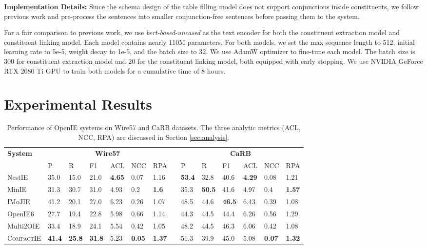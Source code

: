 \documentclass[11pt,a4paper]{article}
\newcommand{\system}{{\textsc{CompactIE}}}
\begin{document}
\noindent
\textbf{{Implementation Details:}} 
{Since the schema design of the table filling model does not support conjunctions inside constituents, we follow previous work \citep{openie6} and pre-process the sentences into smaller conjunction-free sentences before passing them to the system. }

For a fair comparison to previous work, we use {\it bert-based-uncased} \cite{DBLP:journals/corr/abs-1810-04805} as the text encoder for both the constituent extraction model and constituent linking model. Each model contains nearly 110M parameters. {For both models, we set the max sequence length to 512, initial learning rate to 5e-5, weight decay to 1e-5, and the batch size to 32}. We use AdamW optimizer to fine-tune each model. The batch size is 300 for constituent extraction model and 20 for the constituent linking model, both equipped with early stopping.
We use NVIDIA GeForce RTX 2080 Ti GPU to train both models for a cumulative time of 8 hours.

\section{Experimental Results}
\label{experimental_results}

\begin{table*}[t]
\begin{center}
\resizebox{0.9\linewidth}{!} {
\begin{tabular}{llllllllllllll} 
\hline
\textbf{System} & \multicolumn{6}{c}{\textbf{Wire57}} && \multicolumn{6}{c}{\textbf{CaRB}}\\
\cline{2-7} \cline{9-14}
 & P & R & F1 & ACL & NCC & RPA & & P & R & F1 & ACL & NCC & RPA\\
\hline
NestIE & 35.0 & 15.0 & 21.0 & {\bf 4.65} & 0.07 & 1.16 & & {\bf 53.4} & 32.8 & 40.6 & \textbf{4.29} & 0.08 & 1.21\\ 
MinIE & 31.3 & 30.7 & 31.0 & 4.93 & 0.2 & \textbf{1.6} & & 35.3 & {\bf 50.5} & 41.6 & 4.97 & 0.4 & \textbf{1.57}\\
\hline
IMoJIE & 41.2 & 20.1 & 27.0 & 6.23 & 0.26 & 1.07 & & 48.5 & 44.6 & \textbf{46.5} & 6.43 & 0.39 & 1.08\\ 
OpenIE6 & 27.7 & 19.4 & 22.8 & 5.98 & 0.66 & 1.14 & & 44.3 & 44.5 & 44.4 & 6.26 & 0.56 & 1.29\\ 
Multi2OIE & 33.4 & 18.9 & 24.1 & 5.54 & 0.42 & 1.05 & & 48.2 & 44.5 & 46.3 & 6.06 & 0.42 & 1.08\\
\hline
\system{} & \textbf{41.4} & \textbf{25.8} & \textbf{31.8} & {5.23} & \textbf{0.05} & \textbf{1.37} & & 51.3 & 39.9 & 45.0 & 5.08 & \textbf{0.07} & \textbf{1.32}\\

\hline
\end{tabular}
}
\end{center}
\caption{\label{main_results} Performance of OpenIE systems on Wire57 and CaRB datasets. The three analytic metrics (ACL, NCC, RPA) are discussed in Section \ref{sec:analysis}.}
\end{table*}
\end{document}
